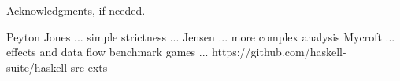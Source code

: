 \documentclass{sigplanconf}
\begin{document}
%

\acks

Acknowledgments, if needed.





\begin{thebibliography}{}
\softraggedright

Peyton Jones ... simple strictness ...
Jensen ... more complex analysis
Mycroft ... effects and data flow
benchmark games ...
https://github.com/haskell-suite/haskell-src-exts
\end{thebibliography}
\end{document}
